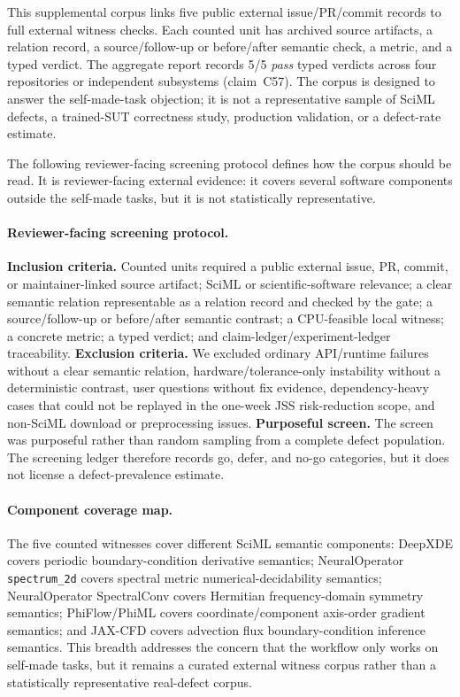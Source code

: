 This supplemental corpus links five public external issue/PR/commit records to
full external witness checks. Each counted unit has archived source artifacts,
a relation record, a source/follow-up or before/after semantic check, a metric, and a
typed verdict. The aggregate report records 5/5 \emph{pass} typed verdicts
across four repositories or independent subsystems (claim~C57). The corpus is
designed to answer the self-made-task objection; it is not a representative
sample of SciML defects, a trained-SUT correctness study, production validation,
or a defect-rate estimate.

The following reviewer-facing screening protocol defines how the corpus should
be read. It is reviewer-facing external evidence: it covers several software
components outside the self-made tasks, but it is not statistically
representative.

\paragraph{Reviewer-facing screening protocol.}
\textbf{Inclusion criteria.} Counted units required a public external issue,
PR, commit, or maintainer-linked source artifact; SciML or
scientific-software relevance; a clear semantic relation representable as a relation record and checked by the gate; a source/follow-up or before/after semantic contrast; a
CPU-feasible local witness; a concrete metric; a typed verdict; and
claim-ledger/experiment-ledger traceability.
\textbf{Exclusion criteria.} We excluded ordinary API/runtime failures without
a clear semantic relation, hardware/tolerance-only instability without a
deterministic contrast, user questions without fix evidence, dependency-heavy
cases that could not be replayed in the one-week JSS risk-reduction scope, and
non-SciML download or preprocessing issues. \textbf{Purposeful screen.} The
screen was purposeful rather than random sampling from a complete defect
population. The screening ledger therefore records go, defer, and no-go
categories, but it does not license a defect-prevalence estimate.

\paragraph{Component coverage map.}
The five counted witnesses cover different SciML semantic components:
DeepXDE covers periodic boundary-condition derivative semantics;
NeuralOperator \texttt{spectrum\_2d} covers spectral metric numerical-decidability semantics; NeuralOperator SpectralConv covers
Hermitian frequency-domain symmetry semantics; PhiFlow/PhiML covers
coordinate/component axis-order gradient semantics; and JAX-CFD covers
advection flux boundary-condition inference semantics. This breadth addresses
the concern that the workflow only works on self-made tasks, but it remains a
curated external witness corpus rather than a statistically representative
real-defect corpus.

